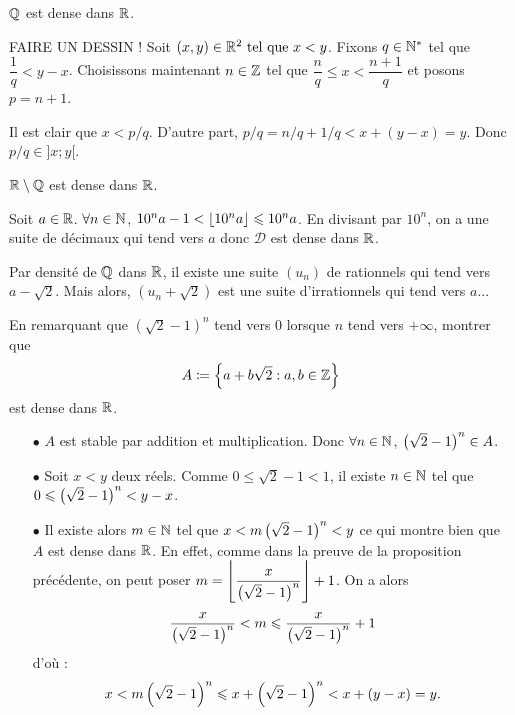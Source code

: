 \documentclass{magnoliaold}
\begin{document}
  \begin{proposition}[utile=-3]
  $\mathbb{Q}$ est dense dans $\mathbb{R}$.
  \end{proposition}
  
  \begin{preuve}
  FAIRE UN DESSIN ! Soit $(x,y)\in \mathbb{R}^2 \text{ tel que } x<y$. Fixons $q\in {\mathbb{N}^*}$ tel que $\dfrac{1}{q}<y-x$. Choisissons maintenant $n\in\mathbb{Z}$ tel que $\dfrac{n}{q}\leq x < \dfrac{n+1}{q}$ et posons $p=n+1$.
  
  Il est clair que $x<p/q$. D'autre part, $p/q=n/q+1/q <x+(y-x)=y$. Donc $p/q\in ]x;y[$.
  \end{preuve}
  
  \begin{remarqueUnique}
  \remarque $\mathbb{R}\setminus\mathbb{Q}$ est dense dans $\mathbb{R}$.
  \begin{sol}
  Soit $a\in \mathbb{R}$. $\forall n \in \mathbb{N}$, $10^n a-1 < \left\lfloor10^n a\right\rfloor\leqslant 10^n a$. En divisant par $10^n$, on a une suite de décimaux qui tend vers $a$ donc $\mathcal{D}$ est dense dans $\mathbb{R}$.
  
  Par densité de $\mathbb{Q}$ dans $\mathbb{R}$, il existe une suite $(u_n)$ de rationnels qui tend vers $a-\sqrt{2}$. Mais alors, $(u_n+\sqrt{2})$ est une suite d'irrationnels qui tend vers $a$...
  \end{sol}
  \end{remarqueUnique}
  
  \begin{exoUnique}
  \exo En remarquant que $(\sqrt{2}-1)^n$ tend vers 0 lorsque $n$ tend vers
    $+\infty$, montrer que
    \[A\coloneqq\left\{a+b\sqrt{2} : a,b\in\mathbb{Z}\right\}\]
    est dense dans $\mathbb{R}$.
    
  \begin{sol}
  \begin{itemize}
  \item[$\bullet$] $A$ est stable par addition et multiplication. Donc $\forall n \in \mathbb{N}$, $\left(\sqrt{2}-1\right)^n \in A$.
  \item[$\bullet$] Soit $x<y$ deux réels. Comme $0\leq \sqrt{2}-1<1$, il existe $n\in \mathbb{N}$ tel que $0\leqslant \left(\sqrt{2}-1\right)^n < y-x$.
  \item[$\bullet$] Il existe alors $m\in \mathbb{N}$ tel que $x<m\left(\sqrt{2}-1\right)^n <y$ ce qui montre bien que $A$ est dense dans $\mathbb{R}$. En effet, comme dans la preuve de la proposition précédente, on peut poser $m=\displaystyle \left\lfloor\frac{x}{\left(\sqrt{2}-1\right)^n}\right\rfloor+1$. On a alors $$\frac{x}{\left(\sqrt{2}-1\right)^n}<m \leqslant \frac{x}{\left(\sqrt{2}-1\right)^n}+1$$ d'où :$$x<m\left(\sqrt{2}-1\right)^n \leqslant x+\left(\sqrt{2}-1\right)^n <x+(y-x)=y.$$
  
  \end{itemize}
  \end{sol}
  \end{exoUnique}
\end{document}
